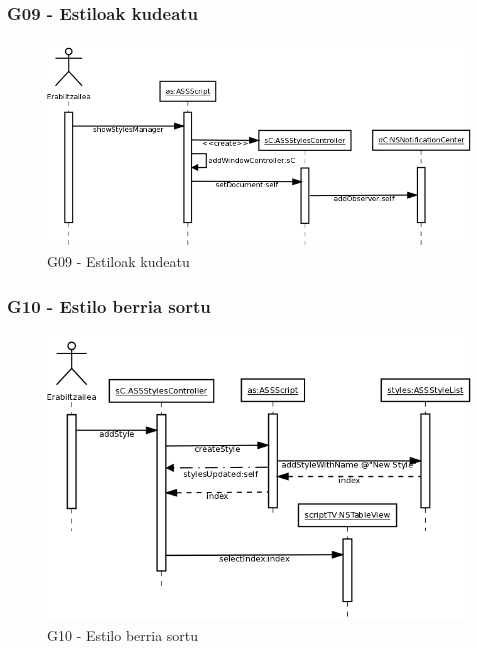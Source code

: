 \subsubsection{G09 - Estiloak kudeatu}
\begin{figure}[htp]
\begin{center}
\includegraphics[scale=0.35]{Pictures/Chapter4/Diseinua/G09.png}
\caption{G09 - Estiloak kudeatu}
\label{g09d}
\end{center}
\end{figure}

\newpage
\subsubsection{G10 - Estilo berria sortu}
\begin{figure}[htp]
\begin{center}
\includegraphics[scale=0.35]{Pictures/Chapter4/Diseinua/G10.png}
\caption{G10 - Estilo berria sortu}
\label{g10d}
\end{center}
\end{figure}


